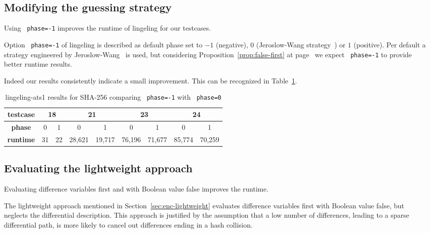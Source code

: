 \subsection{Modifying the guessing strategy}
\label{sec:results-guessing}
%
\newcommand\mone[1][-1]{\texttt{\textendash{}\,\textendash{}phase=#1}}
\begin{prop}
  Using \mone{} improves the runtime of lingeling for our testcases.
\end{prop}
%
Option \mone{} of lingeling is described as default phase set to
$-1$ (negative), $0$ (Jeroslow-Wang strategy~\cite{JeroslowWang})
or $1$ (positive). Per default a strategy engineered by
Jeroslow-Wang~\cite{JeroslowWang} is used, but considering
Proposition~\ref{prop:false-first} at page~\pageref{prop:false-first}
we expect \mone{} to provide better runtime results.

Indeed our results consistently indicate a small improvement.
This can be recognized in Table~\ref{tab:phase-results}.

\begin{table}[!h]
  \begin{center}
    \begin{tabular}{c|cc cc cc cc}
      \textbf{testcase} & \multicolumn{2}{c}{18} & \multicolumn{2}{c}{21} & \multicolumn{2}{c}{23} & \multicolumn{2}{c}{24} \\
    \hline
      \textbf{phase}    &       0 &      1 &       0 &      1 &       0 &      1 &       0 &      1 \\
    \hline
      \textbf{runtime}  &      31 &     22 &  28,621 & 19,717 &  76,196 & 71,677 & 85,774  & 70,259 \\
    \end{tabular}
    \caption{lingeling-ats1 results for SHA-256 comparing \mone{} with \mone[0]{}}
    \label{tab:phase-results}
  \end{center}
\end{table}

\subsection{Evaluating the lightweight approach}
\label{sec:lightweight-results}
%
\begin{prop}
  Evaluating difference variables first and with Boolean value false improves the runtime.
\end{prop}
%
The lightweight approach mentioned in Section~\ref{sec:enc-lightweight}
evaluates difference variables first with Boolean value false,
but neglects the differential description.
This approach is justified by the assumption that a low number of differences,
leading to a sparse differential path, is more likely to cancel out differences
ending in a hash collision.

